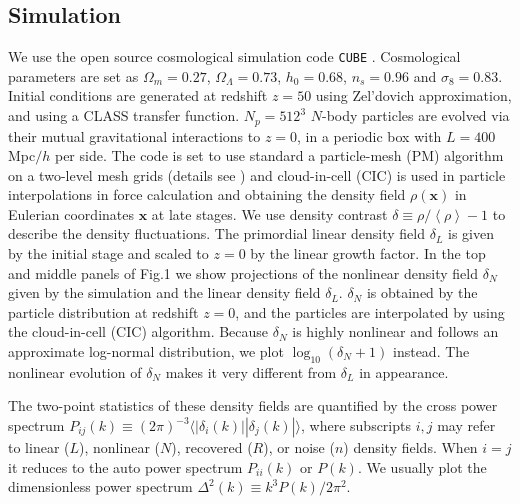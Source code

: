 \documentclass[aps,prd,twocolumn,superscriptaddress,amsfont,amssymb,amsmath,nofootinbib,showpacs,balancelastpage]{revtex4-1}
\newcommand{\bs}{\boldsymbol}
\newcommand{\lb}{\left\langle}
\newcommand{\rb}{\right\rangle}
\begin{document}
\subsection{Simulation}\label{ss.sim}
We use the open source cosmological simulation code {\tt CUBE} %
\citep{cafcube}.
Cosmological parameters are set as
$\Omega_m=0.27$, $\Omega_\Lambda=0.73$, $h_0=0.68$, $n_s=0.96$ and $\sigma_8=0.83$.
Initial conditions are generated at redshift $z=50$ 
using Zel'dovich approximation, and using a CLASS transfer function.
$N_p=512^3$ $N$-body particles are evolved via 
their mutual gravitational interactions to $z=0$, in a periodic box with $L=400$ 
Mpc$/h$ per side. The code is set to use standard a particle-mesh (PM) algorithm 
\cite{1988csup.book.....H} on a two-level mesh grids
(details see \cite{2013MNRAS.436..540H}) and cloud-in-cell
(CIC) is used in particle interpolations in force 
calculation and obtaining the density field $\rho({\bs x})$ in Eulerian coordinates 
${\bs x}$ at late stages. We use density contrast $\delta\equiv\rho/\lb\rho\rb-1$ 
to describe the density fluctuations. The primordial linear density field $
\delta_L$ is given by the initial stage and scaled to $z=0$ by the linear growth 
factor. In the top and middle panels of Fig.1 we show projections of the nonlinear density field
$\delta_N$ given by the simulation and the linear density field $\delta_L$.
$\delta_N$ is obtained by the particle distribution at redshift $z=0$, and
the particles are interpolated by using the cloud-in-cell (CIC) algorithm.
Because $\delta_N$ is highly nonlinear and follows an approximate
log-normal distribution, we plot $\log_{10}(\delta_N+1)$ instead.
The nonlinear evolution of $\delta_N$ makes it very different from $\delta_L$
in appearance.

The two-point statistics of these density fields are quantified by the cross power 
spectrum $P_{ij}(k)\equiv(2\pi)^{-3}\langle|\delta_i(k)||\delta_j(k)|\rangle$, 
where subscripts $i,j$ may refer to linear ($L$), nonlinear ($N$),
recovered ($R$), or noise ($n$) density 
fields. When $i=j$ it reduces to the auto power spectrum $P_{ii}(k)$ or $P(k)$. We 
usually plot the dimensionless power spectrum $\Delta^2(k)\equiv k^3P(k)/2\pi^2$. 
\end{document}
